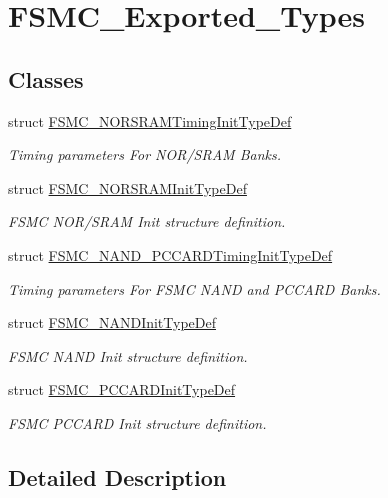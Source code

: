 \hypertarget{group___f_s_m_c___exported___types}{}\section{F\+S\+M\+C\+\_\+\+Exported\+\_\+\+Types}
\label{group___f_s_m_c___exported___types}
\subsection*{Classes}
\begin{DoxyCompactItemize}
\item 
struct \hyperlink{struct_f_s_m_c___n_o_r_s_r_a_m_timing_init_type_def}{F\+S\+M\+C\+\_\+\+N\+O\+R\+S\+R\+A\+M\+Timing\+Init\+Type\+Def}
\begin{DoxyCompactList}\small\item\em Timing parameters For N\+O\+R/\+S\+R\+AM Banks. \end{DoxyCompactList}\item 
struct \hyperlink{struct_f_s_m_c___n_o_r_s_r_a_m_init_type_def}{F\+S\+M\+C\+\_\+\+N\+O\+R\+S\+R\+A\+M\+Init\+Type\+Def}
\begin{DoxyCompactList}\small\item\em F\+S\+MC N\+O\+R/\+S\+R\+AM Init structure definition. \end{DoxyCompactList}\item 
struct \hyperlink{struct_f_s_m_c___n_a_n_d___p_c_c_a_r_d_timing_init_type_def}{F\+S\+M\+C\+\_\+\+N\+A\+N\+D\+\_\+\+P\+C\+C\+A\+R\+D\+Timing\+Init\+Type\+Def}
\begin{DoxyCompactList}\small\item\em Timing parameters For F\+S\+MC N\+A\+ND and P\+C\+C\+A\+RD Banks. \end{DoxyCompactList}\item 
struct \hyperlink{struct_f_s_m_c___n_a_n_d_init_type_def}{F\+S\+M\+C\+\_\+\+N\+A\+N\+D\+Init\+Type\+Def}
\begin{DoxyCompactList}\small\item\em F\+S\+MC N\+A\+ND Init structure definition. \end{DoxyCompactList}\item 
struct \hyperlink{struct_f_s_m_c___p_c_c_a_r_d_init_type_def}{F\+S\+M\+C\+\_\+\+P\+C\+C\+A\+R\+D\+Init\+Type\+Def}
\begin{DoxyCompactList}\small\item\em F\+S\+MC P\+C\+C\+A\+RD Init structure definition. \end{DoxyCompactList}\end{DoxyCompactItemize}


\subsection{Detailed Description}
